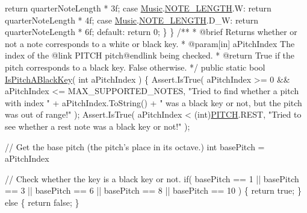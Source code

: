 \begin{DoxyCodeInclude}
                \textcolor{keywordflow}{return} quarterNoteLength * 3f;
            \textcolor{keywordflow}{case} \hyperlink{class_music}{Music}.\hyperlink{group___music_enums_gaf11b5f079adbb21c800b9eca1c5c3cbd}{NOTE\_LENGTH}.W:
                \textcolor{keywordflow}{return} quarterNoteLength * 4f;
            \textcolor{keywordflow}{case} \hyperlink{class_music}{Music}.\hyperlink{group___music_enums_gaf11b5f079adbb21c800b9eca1c5c3cbd}{NOTE\_LENGTH}.D\_W:
                \textcolor{keywordflow}{return} quarterNoteLength * 6f;
            \textcolor{keywordflow}{default}:
                \textcolor{keywordflow}{return} 0;
        \}
    \}
\textcolor{comment}{}
\textcolor{comment}{    /** }
\textcolor{comment}{     * @brief Returns whether or not a note corresponds to a white or black key.}
\textcolor{comment}{     * @param[in] aPitchIndex The index of the @link PITCH pitch@endlink being checked.}
\textcolor{comment}{     * @return True if the pitch corresponds to a black key. False otherwise.}
\textcolor{comment}{    */}
    \textcolor{keyword}{public} \textcolor{keyword}{static} \textcolor{keywordtype}{bool} \hyperlink{group___music_stat_func_gacc2c1a66df7197225f61c5737f794065}{IsPitchABlackKey}( \textcolor{keywordtype}{int} aPitchIndex )
    \{
        Assert.IsTrue( aPitchIndex >= 0 && aPitchIndex <= MAX\_SUPPORTED\_NOTES, 
            \textcolor{stringliteral}{"Tried to find whether a pitch with index "} + aPitchIndex.ToString() + \textcolor{stringliteral}{" was a black key or
       not, but the pitch was out of range!"} );
        Assert.IsTrue( aPitchIndex < (\textcolor{keywordtype}{int})\hyperlink{group___music_enums_ga508f69b199ea518f935486c990edac1d}{PITCH}.REST, \textcolor{stringliteral}{"Tried to see whether a rest note was a black
       key or not!"} );

        \textcolor{comment}{// Get the base pitch (the pitch's place in its octave.)}
        \textcolor{keywordtype}{int} basePitch = aPitchIndex %

        \textcolor{comment}{// Check whether the key is a black key or not.}
        \textcolor{keywordflow}{if}( basePitch == 1 || basePitch == 3 || basePitch == 6 || basePitch == 8 || basePitch == 10 )
        \{
            \textcolor{keywordflow}{return} \textcolor{keyword}{true};
        \}
        \textcolor{keywordflow}{else}
        \{
            \textcolor{keywordflow}{return} \textcolor{keyword}{false};
        \}


\end{DoxyCodeInclude}
